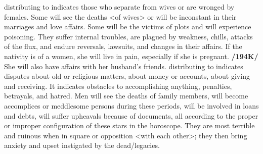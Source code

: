 \Saturn\xspace distributing to \Venus\xspace indicates those who separate from wives or are wronged by females. Some will see the deaths <of wives> or will be inconstant in their marriages and love affairs. Some will be the victims of plots and will experience poisoning. They suffer internal troubles, are plagued by weakness, chills, attacks of the flux, and endure reversals, lawsuits, and changes in their affairs. If the nativity is of a women, she will live in pain, especially if she is pregnant. \textbf{/194K/} She will also have affairs with her husband’s friends.
\enlargethispage{2\baselineskip}
\Saturn\xspace distributing to \Mercury\xspace indicates disputes about old or religious matters, about money or
accounts, about giving and receiving. It indicates obstacles to accomplishing anything, penalties, betrayals, and hatred. Men will see the deaths of family members, will become accomplices or meddlesome persons during these periods, will be involved in loans and debts, will suffer upheavals because of documents, all according to the proper or improper configuration of these stars in the horoscope. They are most terrible and ruinous when in square or opposition <with each other>; they then bring anxiety and upset instigated by the dead/legacies.

\newpage